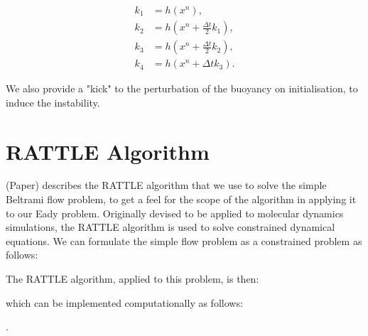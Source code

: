 \documentclass[11pt, oneside]{article}   	%
\newcommand{\dt}{\Delta t}
\begin{document}
\begin{align} 
k_1 &= h(x^n), \\
k_2 &= h(x^n + \frac{\dt}{2}k_1), \\
k_3 &= h(x^n + \frac{\dt}{2}k_2), \\
k_4 &= h(x^n + \dt k_3).
\end{align}

We also provide a "kick" to the perturbation of the buoyancy on initialisation, to induce the instability.


\section{RATTLE Algorithm}

(Paper) describes the RATTLE algorithm that we use to solve the simple Beltrami flow problem, to get a feel for the scope of the algorithm in applying it to our Eady problem. Originally devised to be applied to molecular dynamics simulations, the RATTLE algorithm is used to solve constrained dynamical equations. We can formulate the simple flow problem as a constrained problem as follows:

The RATTLE algorithm, applied to this problem, is then:

which can be implemented computationally as follows:

.
\end{document}
